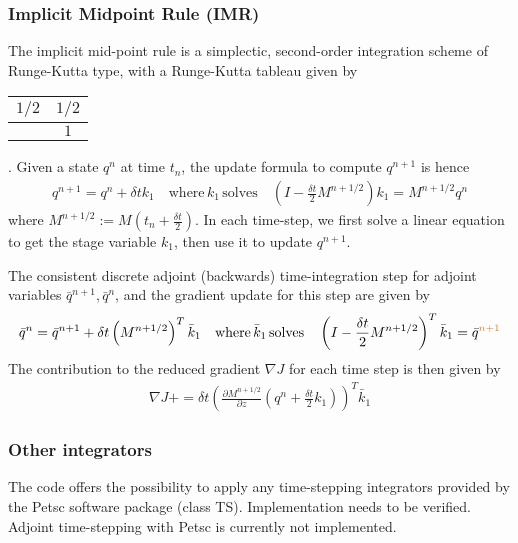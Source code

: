 \documentclass[letterpaper]{article}
\newcommand{\YC}[1]{{\textcolor{Bronze}{#1}}}
\begin{document}
    \subsubsection{Implicit Midpoint Rule (IMR)} 
    The implicit mid-point rule is a simplectic, second-order integration scheme
    of Runge-Kutta type, with a Runge-Kutta tableau given by
    \begin{tabular}{ c | c }
      $1/2$ & $ 1/2$ \\
      \hline
                &  $1$
    \end{tabular}.
    Given a state $q^n$ at time $t_n$, the update formula to compute $q^{n+1}$
    is hence 
    \begin{align}
      q^{n+1} = q^n + \delta t k_1 \quad \text{where} \, k_1 \, \text{solves}
      \quad \left( I-\frac{\delta t}{2} M^{n+1/2} \right) k_1 = M^{n+1/2}  q^n
    \end{align}
    where $M^{n+1/2} := M(t_n + \frac{\delta t}{2})$. In each time-step, we
    first solve a linear equation to get the stage variable $k_1$, then use it
    to update $q^{n+1}$. 

    The consistent discrete adjoint (backwards) time-integration step for
    adjoint variables $\bar q^{n+1}, \bar q^n$, and the gradient update for this
    step are given by
    \begin{align}
      \bar q^{n} = \bar q^{n+1} + \delta t \left(M^{n+1/2}\right)^T \bar k_1
      \quad \text{where} \, \bar k_1 \, \text{solves} \quad \left(
      I-\frac{\delta t}{2} M^{n+1/2}\right)^T  \bar k_1 = \bar q^{\YC{n+1}} 
    \end{align}
    The contribution to the reduced gradient $\nabla J$ for each time step is
    then given by
    \begin{align}
      \nabla J += \delta t \left( \frac{\partial M^{n+1/2}}{\partial z}
      \left(q^n + \frac{\delta t}{2} k_1\right) \right)^T\bar k_1
    \end{align}


    \subsubsection{Other integrators}
    The code offers the possibility to apply any time-stepping integrators
    provided by the Petsc software package (class TS). Implementation needs to
    \YC{be} verified. Adjoint time-stepping with Petsc is currently not
    implemented. 
\end{document}
